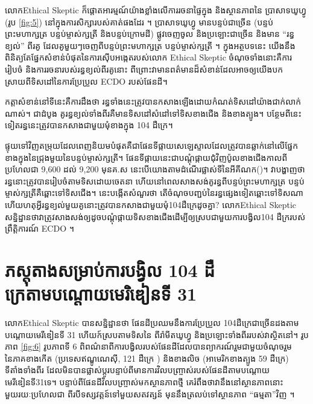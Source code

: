 \documentclass[10pt,twocolumn,letterpaper]{article}
\begin{document}
លោកEthical Skeptic ក៏ផ្តោតអារម្មណ៍យ៉ាងខ្លាំងលើការរចនាផ្ទៃក្នុង និងស្ថានភាពនៃ ប្រាសាទឃូហ្វូ (រូប \ref{fig:5}) នៅក្នុងការសិក្សារបស់គាត់ផងដែរ \cite{28}។ ប្រាសាទឃូហ្វូ មានបន្ទប់ជាច្រើន (បន្ទប់ព្រះមហាក្សត្រ បន្ទប់ម្ចាស់ក្សត្រី និងបន្ទប់ក្រោមដី) ផ្លូវចេញចូល និងប្រឡោះជាច្រើន និងមាន “រន្ធខ្យល់” ពីរគូ ដែលគូមួយៗចេញពីបន្ទប់ព្រះមហាក្សត្រ បន្ទប់ម្ចាស់ក្សត្រី \cite{29,30}។ ក្នុងអត្ថបទនេះ យើងនឹងពិនិត្យតែផ្នែកសំខាន់បំផុតនៃការស៊ើបអង្កេតរបស់លោក Ethical Skeptic ចំណុចទាំងនោះគឺការរៀបចំ និងការរចនារបស់រន្ធខ្យល់ពីរគូនោះ ពីព្រោះវាមានពត៌មានដ៏សំខាន់ដែលអាចឲ្យយើងបកស្រាយពីទិសដៅនៃការប្រែប្រួល ECDO របស់ផែនដី។

កត្តាសំខាន់នៅទីនេះគឺការដឹងថា រន្ធទាំងនេះត្រូវបានកសាងឡើងដោយកំណត់ទិសដៅយ៉ាងជាក់លាក់ណាស់។ ជាដំបូង គូរន្ធខ្យល់ទាំងពីរគឺមានទិសដៅសំដៅទៅទិសខាងជើង និងខាងត្បូង។ បន្ថែមពីនេះទៀតរន្ធនេះត្រូវបានកសាងជាមួយមុំខាងក្នុង 104 ដឺក្រេ។

ផ្ទុយទៅវិញតម្រុយដែលពេញនិយមបំផុតគឺជាផែនទីផ្កាយសេឡេស្ទាលដែលត្រូវបានឆ្លាក់នៅលើផ្នែកខាងក្នុងនៃជ្រុងមួយនៃបន្ទប់ម្ចាស់ក្សត្រី។ ផែនទីផ្កាយនេះជាបណ្តុំផ្កាយជុំវិញប៉ូលខាងជើងកាលពីប្រហែលជា 9,600 ដល់ 9,200 មុនគ.ស នេះបើយោងតាមដំណើរផ្លាស់ទីនៃអីគីណក(\cite{28})។ វាបង្ហាញថារន្ធនោះត្រូវបានរៀបចំតាមទិសដោយចេតនា ហើយនៅពេលសាងសង់គូរន្ធពីបន្ទប់ព្រះមហាក្សត្រ បន្ទប់ម្ចាស់ក្សត្រីគឺឆ្ពោះទៅទិសជើង។ នេះបង្កើតសំណួរថា តើចំណុចបញ្ជប់នៃរន្ធផ្សេងទៀតឆ្ពោះទៅទិសណា ហើយហតុអ្វីរន្ធខ្យល់មួយគូនោះត្រូវបានកសាងជាមួយមុំ104ដឺក្រេដូចគ្នា? លោកEthical Skeptic សន្និដ្ឋានថាវាត្រូវសាងសង់ឲ្យដូចបណ្តុំផ្កាយទិសខាងជើងដើម្បីឲ្យស្របជាមួយការបង្វិល104 ដឺក្ររបស់ព្រឹត្តិការណ៍ ECDO ។

\section{ភស្តុតាងសម្រាប់ការបង្វិល 104 ដឺក្រេតាមបណ្តោយមេរិឌៀនទី 31}

លោកEthical Skeptic បានសន្និដ្ឋានថា ផែនដីប្រឈមនឹងការប្រែប្រួល 104ដឺក្រេជាច្រើនដង​តាមបណ្តោយមេរីឌៀនទី 31 ហើយក៍ស្របតាមទិសនៃ 
ពីរ៉ាមីតឃូហ្វូ និងប្រឡោះទាំងពីររបស់វាស្ថិតនៅ។ រូបភាព \ref{fig:6} រូបភាពទី 6 ពិពណ៌នាពីការបង្វិលរបស់ផែនដីដែលបានព្យាករណ៍រួមជាមួយចំណុចរួមនៃភាគខាងកើត (ប្រទេស​ឥណ្ឌូណេស៊ី, 121 ដឺក្រេ 
) និងខាងលិច (អាមេរិកខាងត្បូង 59 ដឺក្រេ)  ទីតាំងទាំងពីរ 
ដែលមិនបានផ្លាស់ប្តូរបន្ទាប់ពីមានការវិលបញ្ច្រាស់របស់ផែនដីតាមបណ្តោយមេរីឌៀនទី31ទេ។ បន្ទាប់ពីផែនដីវិលបញ្ច្រាស់មកស្ថានភាពថ្មី គេរំពឹងថាវានឹងនៅស្ថានភាពនោះមួយរយៈប្រហែលជា ពីរ​បីទស្សវត្តន៍ទៅមួយសតវត្សន៍ មុននឹងត្រលប់ទៅស្ថានភាព “ធម្មតា”វិញ \cite{150}។
\end{document}
